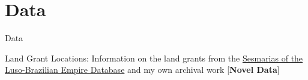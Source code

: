 \documentclass[aspectratio=1610]{beamer}
\begin{document}


\section{Data}

\begin{frame}{Data}
    \begin{outline}
        \1 Land Grant Locations:
        \vspace{2mm}
            \2 Information on the land grants from the \href{http://plataformasilb.cchla.ufrn.br/}{Sesmarias of the Luso-Brazilian Empire Database} and my own archival work [\textbf{Novel Data}]
    \end{outline}
\end{frame}
\end{document}
